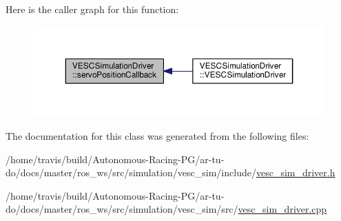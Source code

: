 Here is the caller graph for this function\+:
\nopagebreak
\begin{figure}[H]
\begin{center}
\leavevmode
\includegraphics[width=350pt]{class_v_e_s_c_simulation_driver_a79a48177b8910e181653900308eff310_icgraph}
\end{center}
\end{figure}




The documentation for this class was generated from the following files\+:\begin{DoxyCompactItemize}
\item 
/home/travis/build/\+Autonomous-\/\+Racing-\/\+P\+G/ar-\/tu-\/do/docs/master/ros\+\_\+ws/src/simulation/vesc\+\_\+sim/include/\hyperlink{vesc__sim__driver_8h}{vesc\+\_\+sim\+\_\+driver.\+h}\item 
/home/travis/build/\+Autonomous-\/\+Racing-\/\+P\+G/ar-\/tu-\/do/docs/master/ros\+\_\+ws/src/simulation/vesc\+\_\+sim/src/\hyperlink{vesc__sim__driver_8cpp}{vesc\+\_\+sim\+\_\+driver.\+cpp}\end{DoxyCompactItemize}
